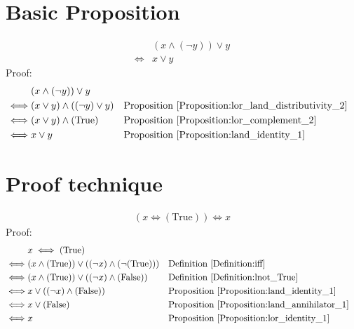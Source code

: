 \section{Basic Proposition}
\begin{prop}
\label{Proposition:x_lor_y_complement}
\begin{align*}
& (x \land (\lnot y)) \lor y \\
\iff & x \lor y
\end{align*}
Proof:
\begin{align*}
& (x \land (\lnot y)) \lor y \\
\iff & (x \lor y) \land ((\lnot y) \lor y)
&& \text{Proposition \ref{Proposition:lor_land_distributivity_2}} \\
\iff & (x \lor y) \land (\text{True})
&& \text{Proposition \ref{Proposition:lor_complement_2}} \\
\iff & x \lor y
&& \text{Proposition \ref{Proposition:land_identity_1}} \\
\end{align*}
\end{prop}

\section{Proof technique}
\begin{prop}
\begin{align*}
(x \iff (\text{True})) \iff x
\end{align*}
Proof:
\begin{align*}
& x \iff (\text{True}) \\
\iff & (x \land (\text{True})) \lor ((\lnot x) \land (\lnot (\text{True})))
&& \text{Definition \ref{Definition:iff}} \\
\iff & (x \land (\text{True})) \lor ((\lnot x) \land (\text{False}))
&& \text{Definition \ref{Definition:lnot_True}} \\
\iff & x \lor ((\lnot x) \land (\text{False}))
&& \text{Proposition \ref{Proposition:land_identity_1}} \\
\iff & x \lor (\text{False})
&& \text{Proposition \ref{Proposition:land_annihilator_1}} \\
\iff & x
&& \text{Proposition \ref{Proposition:lor_identity_1}} \\
\end{align*}
\end{prop}

